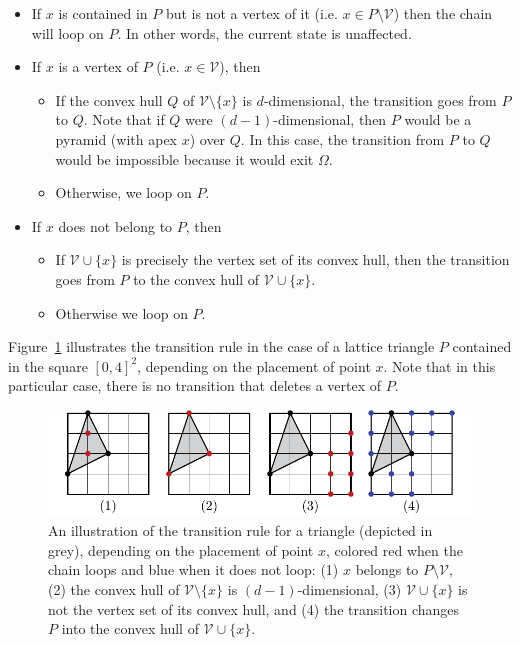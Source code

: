 \documentclass[a4paper,10pt]{article}
\begin{document}
\begin{itemize}
\item If $x$ is contained in $P$ but is not a vertex of it (i.e. $x\in{P}\mathord{\setminus}\mathcal{V}$) then the chain will loop on $P$. In other words, the current state is unaffected.
\item If $x$ is a vertex of $P$ (i.e. $x\in\mathcal{V}$), then
  \begin{itemize}
    \item If the convex hull $Q$ of $\mathcal{V}\mathord{\setminus}\{x\}$ is $d$-dimensional, the transition goes from $P$ to $Q$. Note that if $Q$ were $(d-1)$-dimensional, then $P$ would be a pyramid (with apex $x$) over $Q$. In this case, the transition from $P$ to $Q$ would be impossible because it would exit $\Omega$.
    \item Otherwise, we loop on $P$.
  \end{itemize}
  \item If $x$ does not belong to $P$, then
  \begin{itemize}
    \item If $\mathcal{V}\cup\{x\}$ is precisely the vertex set of its convex hull, then the transition goes from $P$ to the convex hull of $\mathcal{V}\cup \{x\}$.
    \item Otherwise we loop on $P$.
  \end{itemize}
\end{itemize}

Figure~\ref{fig:boucle} illustrates the transition rule in the case of a lattice triangle $P$ contained in the square $[0,4]^2$, depending on the placement of point $x$. Note that in this particular case, there is no transition that deletes a vertex of $P$.

\begin{figure}
  \begin{center}
    \includegraphics[scale=0.9]{boucle-mod}
    \caption{An illustration of the transition rule for a triangle (depicted in grey), depending on the placement of point $x$, colored red when the chain loops and blue when it does not loop: (1) $x$ belongs to $P\mathord{\setminus}\mathcal{V}$, (2) the convex hull of $\mathcal{V}\mathord{\setminus}\{x\}$ is $(d-1)$-dimensional, (3) $\mathcal{V}\cup\{x\}$ is not the vertex set of its convex hull, and (4) the transition changes $P$ into the convex hull of $\mathcal{V}\cup\{x\}$.}
    \label{fig:boucle}
  \end{center}
\end{figure}
\vspace{1ex}
\end{document}
